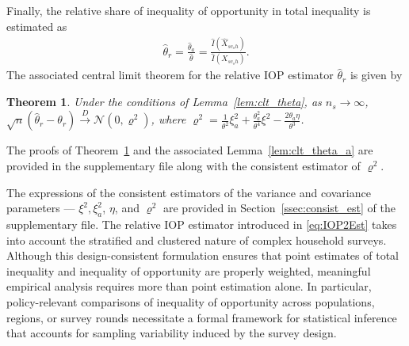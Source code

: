 \documentclass[12pt]{article}
\theoremstyle{plain}
\newtheorem{theorem}{Theorem}
\theoremstyle{definition}
\begin{document}
Finally, the relative share of inequality of opportunity in total inequality is estimated as
\begin{align}
\hat{\theta}_r=\frac{\hat{\theta}_a}{\hat{\theta}}=\frac{\hat{I}(\hat{X}_{sc_sh})}{\hat{I}({X}_{sc_sh})}.
\label{eq:IOP2Est}
\end{align}
The associated central limit theorem for the relative IOP estimator $\hat{\theta}_r$ is given by
\begin{theorem}
\label{thm:clt_theta_r}
Under the conditions of Lemma~\ref{lem:clt_theta}, as $n_s\to\infty$,
$\sqrt n(\hat\theta_r-\theta_r)\xrightarrow{D}
\mathcal N(0,\varrho^2)$,
where $\varrho^2 = \frac{1}{\theta^2}\xi_a^2 
+ \frac{\theta_a^2}{\theta^4}\xi^2 
- \frac{2\theta_a\eta}{\theta^3}$.
\end{theorem}
The proofs of Theorem~\ref{thm:clt_theta_r} and the associated Lemma~\ref{lem:clt_theta_a} are provided in the supplementary file along with the consistent estimator of $\varrho^2$.

The expressions of the consistent estimators of the variance and covariance parameters --- $\xi^2, \xi^2_a$, $\eta$, and $\varrho^2$ are provided in Section~\ref{ssec:consist_est} of the supplementary file. The relative IOP estimator introduced in \eqref{eq:IOP2Est} takes into account the stratified and clustered nature of complex household surveys. Although this design-consistent formulation ensures that point estimates of total inequality and inequality of opportunity are properly weighted, meaningful empirical analysis requires more than point estimation alone. In particular, policy-relevant comparisons of inequality of opportunity across populations, regions, or survey rounds necessitate a formal framework for statistical inference that accounts for sampling variability induced by the survey design. %
\end{document}
